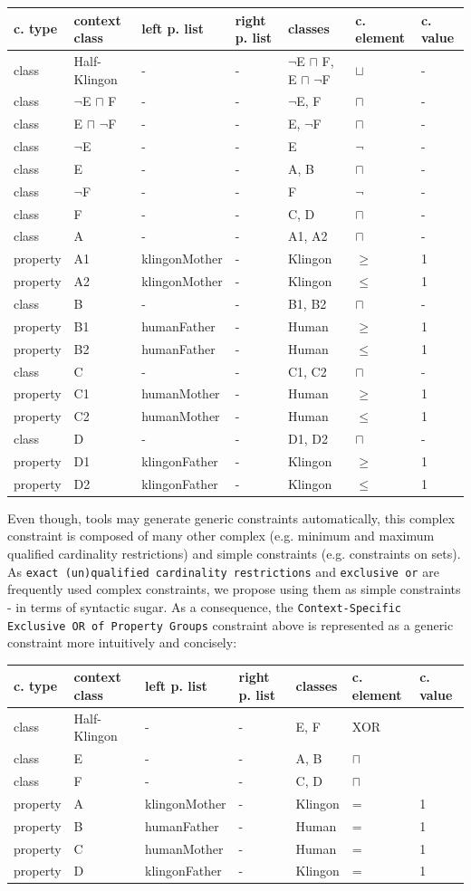 \documentclass{llncs}
\newcommand{\ms}[1]{\texttt{#1}}
\newenvironment{gcotable}{
  \scriptsize
  \sffamily
  \vspace{0cm}
	\begin{center}
  \begin{tabular}{l|l|l|l|l|l|l}
  \hline
  \textbf{c. type} & \textbf{context class} & \textbf{left p. list} & \textbf{right p. list} & \textbf{classes} & \textbf{c. element} & \textbf{c. value} \\
  \hline

}{
  \hline
  \end{tabular}
	\end{center}
}
\begin{document}
\begin{gcotable}
class & Half-Klingon & - & - & $\neg$E $\sqcap$ F, E $\sqcap$ $\neg$F & $\sqcup$ & - \\
class & $\neg$E $\sqcap$ F & - & - & $\neg$E, F & $\sqcap$ & - \\
class & E $\sqcap$ $\neg$F & - & - & E, $\neg$F & $\sqcap$ & - \\
class & $\neg$E & - & - & E & $\neg$ & - \\
class & E & - & - & A, B & $\sqcap$ & - \\
class & $\neg$F & - & - & F & $\neg$ & - \\
class & F & - & - & C, D & $\sqcap$ & - \\
class & A & - & - & A1, A2 & $\sqcap$ & - \\
property & A1 & klingonMother & - & Klingon & $\geq$ & 1 \\
property & A2 & klingonMother & - & Klingon & $\leq$ & 1 \\
class & B & - & - & B1, B2 & $\sqcap$ & - \\
property & B1 & humanFather & - & Human & $\geq$ & 1 \\
property & B2 & humanFather & - & Human & $\leq$ & 1 \\
class & C & - & - & C1, C2 & $\sqcap$ & - \\
property & C1 & humanMother & - & Human & $\geq$ & 1 \\
property & C2 & humanMother & - & Human & $\leq$ & 1 \\
class & D & - & - & D1, D2 & $\sqcap$ & - \\
property & D1 & klingonFather & - & Klingon & $\geq$ & 1 \\
property & D2 & klingonFather & - & Klingon & $\leq$ & 1 \\
\end{gcotable}

Even though, tools may generate generic constraints automatically, this complex constraint is composed of many other complex (e.g. minimum and maximum qualified cardinality restrictions) and simple constraints (e.g. constraints on sets).
As \ms{exact (un)qualified cardinality restrictions} and \ms{exclusive or} are frequently used complex constraints,
we propose using them as simple constraints - 	in terms of syntactic sugar.
As a consequence, the \ms{Context-Specific Exclusive OR of Property Groups} constraint above is represented as a generic constraint more intuitively and concisely:

\begin{gcotable}
class & Half-Klingon & - & - & E, F & XOR \\
class & E & - & - & A, B & $\sqcap$ \\
class & F & - & - & C, D & $\sqcap$ \\
property & A & klingonMother & - & Klingon & = & 1 \\
property & B & humanFather & - & Human & = & 1 \\
property & C & humanMother & - & Human & = & 1 \\
property & D & klingonFather & - & Klingon & = & 1 \\
\end{gcotable}
\end{document}
